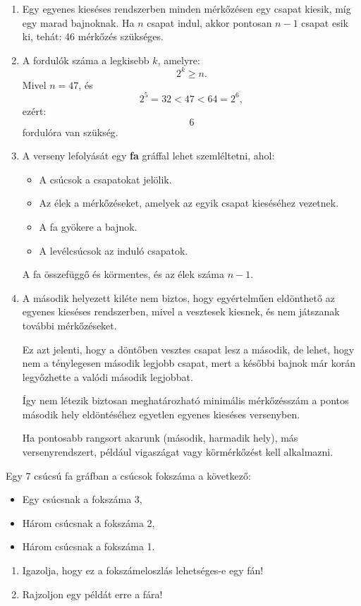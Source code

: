 \begin{solution}
	\begin{enumerate}
\item Egy egyenes kieséses rendszerben minden mérkőzésen egy csapat kiesik,
míg egy marad bajnoknak. Ha $n$ csapat indul, akkor pontosan $n-1$
csapat esik ki, tehát: 46 mérkőzés szükséges.

\item A fordulók száma a legkisebb $k$, amelyre: 
\[
2^{k}\geq n.
\]
Mivel $n=47$, és 
\[
2^{5}=32<47<64=2^{6},
\]
ezért: 
\[
\boxed{6}
\]
fordulóra van szükség.
\item A verseny lefolyását egy \textbf{fa} gráffal lehet szemléltetni, ahol: 
\begin{itemize}
\item A csúcsok a csapatokat jelölik. 
\item Az élek a mérkőzéseket, amelyek az egyik csapat kieséséhez vezetnek. 
\item A fa gyökere a bajnok. 
\item A levélcsúcsok az induló csapatok. 
\end{itemize}
A fa összefüggő és körmentes, és az élek száma $n-1$.
\item A második helyezett kiléte nem biztos, hogy egyértelműen eldönthető
az egyenes kieséses rendszerben, mivel a vesztesek kiesnek, és nem
játszanak további mérkőzéseket.

Ez azt jelenti, hogy a döntőben vesztes csapat lesz a második, de
lehet, hogy nem a ténylegesen második legjobb csapat, mert a későbbi
bajnok már korán legyőzhette a valódi második legjobbat.

Így nem létezik biztosan meghatározható minimális mérkőzésszám a pontos második hely eldöntéséhez egyetlen egyenes kieséses versenyben.

Ha pontosabb rangsort akarunk (második, harmadik hely), más versenyrendszert,
például vigaszágat vagy körmérkőzést kell alkalmazni. 

\end{enumerate}
\end{solution}
\begin{problem}
Egy 7 csúcsú fa gráfban a csúcsok fokszáma a következő: 
\begin{itemize}
\item Egy csúcsnak a fokszáma 3, 
\item Három csúcsnak a fokszáma 2, 
\item Három csúcsnak a fokszáma 1. 
\end{itemize}
\begin{enumerate}
\item Igazolja, hogy ez a fokszámeloszlás lehetséges-e egy fán! 
\item Rajzoljon egy példát erre a fára! 
\end{enumerate}
\end{problem}

